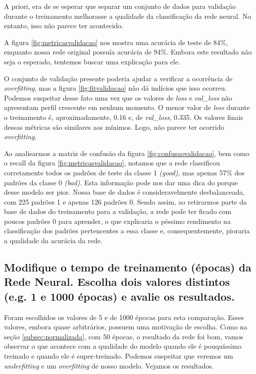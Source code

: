 \documentclass[12pt]{article}
\begin{document}
A priori, era de se esperar que separar um conjunto de dados para validação durante o treinamento melhorasse a qualidade da classificação da rede neural. No entanto, isso não parece ter acontecido.

A figura \ref{fig:metricasvalidacao} nos mostra uma acurácia de teste de 84\%, enquanto nossa rede original possuía acurácia de 94\%. Embora este resultado não seja o esperado, tentemos buscar uma explicação para ele.

O conjunto de validação presente poderia ajudar a verificar a ocorrência de \textit{overfitting}, mas a figura \ref{fig:fitvalidacao} não dá indícios que isso ocorreu. Podemos suspeitar desse fato uma vez que os valores de \textit{loss} e \textit{val\_loss} não apresentam perfil crescente em nenhum momento. O menor valor de \textit{loss} durante o treinamento é, aproximadamente, 0.16 e, de \textit{val\_loss}, 0.335. Os valores finais dessas métricas são similares aos mínimos. Logo, não parece ter ocorrido \textit{overfitting}.

Ao analisarmos a matriz de confusão da figura \ref{fig:confusaovalidacao}, bem como o recall da figura \ref{fig:metricasvalidacao}, notamos que a rede classificou corretamente todos os padrões de teste da classe 1 \textit{(good)}, mas apenas 57\% dos padrões da classe 0 \textit{(bad)}. Esta informação pode nos dar uma dica do porque desse modelo ser pior. Nossa base de dados é consideravelmente desbalanceada, com 225 padrões 1 e apenas 126 padrões 0. Sendo assim, ao retirarmos parte da base de dados do treinamento para a validação, a rede pode ter ficado com poucos padrões 0 para aprender, o que explicaria o péssimo rendimento na classificação dos padrões pertencentes a essa classe e, consequentemente, pioraria a qualidade da acurácia da rede.

\subsection{Modifique o tempo de treinamento (épocas) da Rede Neural. Escolha dois valores distintos (e.g. 1 e 1000 épocas) e avalie os resultados.}

Foram escolhidos os valores de 5 e de 1000 épocas para esta comparação. Esses valores, embora quase arbitrários, possuem uma motivação de escolha. Como na seção \ref{subsec:normalizada}, com 50 épocas, o resultado da rede foi bom, vamos observar o que acontece com a qualidade do modelo quando ele é pouquíssimo treinado e quando ele é super-treinado. Podemos suspeitar que veremos um \textit{underfitting} e um \textit{overfitting} de nosso modelo. Vejamos os resultados. 
\end{document}
